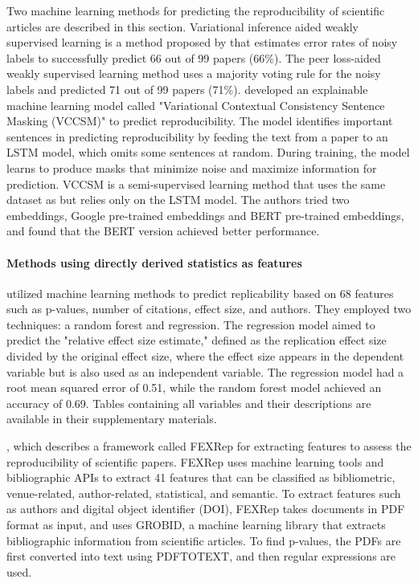 \documentclass[12pt, a4paper, twocolumn]{article}
\newcommand{\subsubsubsection}[1]{\paragraph{#1}}
\begin{document}
			Two machine learning methods for predicting the reproducibility of scientific articles are described in this section. Variational inference aided weakly supervised learning is a method proposed by \citet{Luo2022sentence} that estimates error rates of noisy labels to successfully predict 66 out of 99 papers (66\%). The peer loss-aided weakly supervised learning method uses a majority voting rule for the noisy labels and predicted 71 out of 99 papers (71\%). \citet{Luo2022sentence} developed an explainable machine learning model called "Variational Contextual Consistency Sentence Masking (VCCSM)" to predict reproducibility. The model identifies important sentences in predicting reproducibility by feeding the text from a paper to an LSTM model, which omits some sentences at random. During training, the model learns to produce masks that minimize noise and maximize information for prediction. VCCSM is a semi-supervised learning method that uses the same dataset as \citet{Luo2022sentence} but relies only on the LSTM model. The authors tried two embeddings, Google pre-trained embeddings and BERT pre-trained embeddings, and found that the BERT version achieved better performance.
			

			\subsubsubsection{Methods using directly derived statistics as features}
			\citet{Altmejd2019predicting} utilized machine learning methods to predict replicability based on 68 features such as p-values, number of citations, effect size, and authors. They employed two techniques: a random forest and regression. The regression model aimed to predict the "relative effect size estimate," defined as the replication effect size divided by the original effect size, where the effect size appears in the dependent variable but is also used as an independent variable. The regression model had a root mean squared error of 0.51, while the random forest model achieved an accuracy of 0.69. Tables containing all variables and their descriptions are available in their supplementary materials.
			
			\citet{wu2021predicting}, which describes a framework called FEXRep for extracting features to assess the reproducibility of scientific papers. FEXRep uses machine learning tools and bibliographic APIs to extract 41 features that can be classified as bibliometric, venue-related, author-related, statistical, and semantic. To extract features such as authors and digital object identifier (DOI), FEXRep takes documents in PDF format as input, and uses GROBID, a machine learning library that extracts bibliographic information from scientific articles. To find p-values, the PDFs are first converted into text using PDFTOTEXT, and then regular expressions are used.
			
\end{document}
